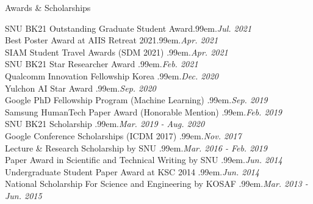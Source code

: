 \documentclass{resume} %
\makeatletter
\newcommand \Dotfill {\leavevmode \cleaders \hb@xt@ .99em{\hss .\hss }\hfill \kern \z@}
\makeatother
\begin{document}

\begin{rSection}{Awards \& Scholarships}

SNU BK21 Outstanding Graduate Student Award\smallskip \Dotfill \emph{Jul. 2021} \\ 
Best Poster Award at AIIS Retreat 2021\smallskip \Dotfill \emph{Apr. 2021} \\ 
SIAM Student Travel Awards (SDM 2021) \smallskip \Dotfill \emph{Apr. 2021} \\ 
SNU BK21 Star Researcher Award \smallskip \Dotfill \emph{Feb. 2021} \\ 
Qualcomm Innovation Fellowship Korea \smallskip \Dotfill \emph{Dec. 2020} \\ 
Yulchon AI Star Award \smallskip \Dotfill \emph{Sep. 2020} \\ 
Google PhD Fellowship Program (Machine Learning) \smallskip \Dotfill \emph{Sep. 2019} \\ 
Samsung HumanTech Paper Award (Honorable Mention) \smallskip \Dotfill \emph{Feb. 2019} \\ 
SNU BK21 Scholarship \smallskip \Dotfill \emph{Mar. 2019 - Aug. 2020} \\ 
Google Conference Scholarships (ICDM 2017) \smallskip \Dotfill \emph{Nov. 2017} \\ 
Lecture \& Research Scholarship by SNU \smallskip \Dotfill \emph{Mar. 2016 - Feb. 2019} \\ 
Paper Award in Scientific and Technical Writing by SNU \smallskip \Dotfill \emph{Jun. 2014} \\ 
Undergraduate Student Paper Award at KSC 2014 \smallskip \Dotfill \emph{Jun. 2014} \\
National Scholarship For Science and Engineering by KOSAF \smallskip \Dotfill \emph{Mar. 2013 - Jun. 2015}

\end{rSection}

\end{document}
